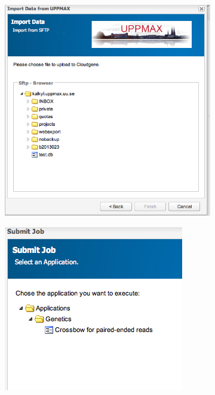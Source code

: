 \documentclass[11pt, oneside]{article}   	%
\begin{document}
\begin{figure}
	\begin{subfigure}[b]{0.6\textwidth}
	        	\includegraphics[width=\textwidth]{c.png}
	\end{subfigure}
 	\begin{subfigure}[b]{0.4\textwidth}
        	\includegraphics[width=\textwidth]{a.png}

\end{subfigure}
\end{figure}
\end{document}
